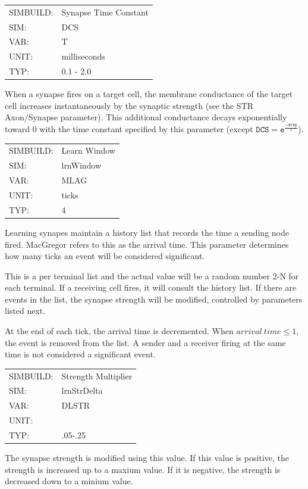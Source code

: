 \documentclass[12pt,openany,oneside]{book}
\newcommand{\tmcode}[1]{\mathtt{#1}}
\begin{document}
\begin{flushleft}
\begin{tabular}{@{}ll@{}}
SIMBUILD: & Synapse Time Constant\\
SIM: & DCS\\
VAR: & T\\
UNIT: & milliseconds\\
TYP: & 0.1 - 2.0\\
\end{tabular}
\end{flushleft}
\noindent
When a synapse fires on a target cell, the membrane conductance of the
target cell increases instantaneously by the synaptic strength (see
the STR Axon/Synapse parameter). This additional conductance decays
exponentially toward 0 with the time constant specified by this
parameter (except $\tmcode{DCS = e^{\tfrac{-step}{T}}}$).
\filbreak
\vspace{\baselineskip}

\begin{flushleft}
\begin{tabular}{@{}ll@{}}
SIMBUILD: & Learn Window\\
SIM: & lrnWindow\\
VAR: & MLAG\\
UNIT: & ticks\\
TYP: & 4\\
\end{tabular}
\end{flushleft}
\noindent
Learning synapes maintain a history list that records the time
a sending node fired. MacGregor \citet{macgregor1987neural} 
refers to this as the arrival time.  This parameter determines 
how many ticks an event will be considered significant. 

This is a per terminal list and the actual value will be a random number
2-N for each terminal. If a receiving cell fires, it 
will consult the history list.  If
there are events in the list, the synapse strength will be modified,
controlled by parameters listed next. 

At the end of each tick, the 
arrival time is decremented. When $arrival\ time \le 1$, the
event is removed from the list. A sender and a receiver firing at
the same time is not considered a significant event.
\filbreak
\vspace{\baselineskip}

\begin{flushleft}
\begin{tabular}{@{}ll@{}}
SIMBUILD: & Strength Multiplier\\
SIM: & lrnStrDelta\\
VAR: & DLSTR\\
UNIT: & \\
TYP: & .05-.25\\
\end{tabular}
\end{flushleft}
\noindent
The synapse strength is modified using this value. If this
value is positive, the strength is increased up to a maxium value. If it
is negative, the strength is decreased down to a minium value.  
\end{document}

